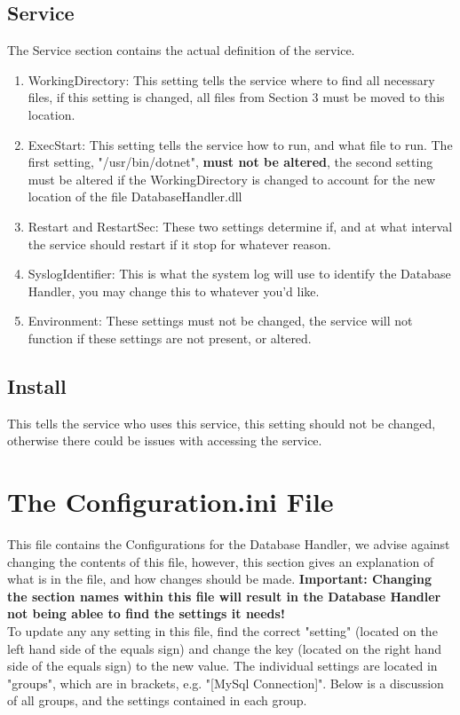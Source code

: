 \documentclass[letterpaper]{article}
\begin{document}
	\subsection{Service}
	The Service section contains the actual definition of the service.
	\begin{enumerate}
		\item WorkingDirectory: This setting tells the service where to find all necessary files, if this setting is changed, all files from Section 3 must be moved to this location.
		\item ExecStart: This setting tells the service how to run, and what file to run. The first setting, "/usr/bin/dotnet", \textbf{must not be altered}, the second setting must be altered if the WorkingDirectory is changed to account for the new location of the file DatabaseHandler.dll
		\item Restart and RestartSec: These two settings determine if, and at what interval the service should restart if it stop for whatever reason. 
		\item SyslogIdentifier: This is what the system log will use to identify the Database Handler, you may change this to whatever you'd like.
		\item Environment: These settings must not be changed, the service will not function if these settings are not present, or altered.
	\end{enumerate}
	
	\subsection{Install}
	This tells the service who uses this service, this setting should not be changed, otherwise there could be issues with accessing the service.
	
	\section{The Configuration.ini File}
	This file contains the Configurations for the Database Handler, we advise against changing the contents of this file, however, this section gives an explanation of what is in the file, and how changes should be made. \textbf{Important: Changing the section names within this file will result in the Database Handler not being ablee to find the settings it needs!}
	\\To update any any setting in this file, find the correct "setting" (located on the left hand side of the equals sign) and change the key (located on the right hand side of the equals sign) to the new value. The individual settings are located in "groups", which are in brackets, e.g. "[MySql Connection]". Below is a discussion of all groups, and the settings contained in each group.
	
\end{document}
